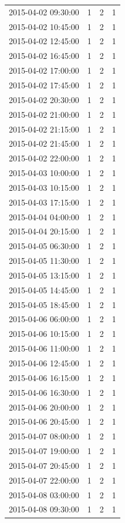 \begin{tabular}{lrrr}
2015-04-02 09:30:00 & 1 & 2 & 1 \\
2015-04-02 10:45:00 & 1 & 2 & 1 \\
2015-04-02 12:45:00 & 1 & 2 & 1 \\
2015-04-02 16:45:00 & 1 & 2 & 1 \\
2015-04-02 17:00:00 & 1 & 2 & 1 \\
2015-04-02 17:45:00 & 1 & 2 & 1 \\
2015-04-02 20:30:00 & 1 & 2 & 1 \\
2015-04-02 21:00:00 & 1 & 2 & 1 \\
2015-04-02 21:15:00 & 1 & 2 & 1 \\
2015-04-02 21:45:00 & 1 & 2 & 1 \\
2015-04-02 22:00:00 & 1 & 2 & 1 \\
2015-04-03 10:00:00 & 1 & 2 & 1 \\
2015-04-03 10:15:00 & 1 & 2 & 1 \\
2015-04-03 17:15:00 & 1 & 2 & 1 \\
2015-04-04 04:00:00 & 1 & 2 & 1 \\
2015-04-04 20:15:00 & 1 & 2 & 1 \\
2015-04-05 06:30:00 & 1 & 2 & 1 \\
2015-04-05 11:30:00 & 1 & 2 & 1 \\
2015-04-05 13:15:00 & 1 & 2 & 1 \\
2015-04-05 14:45:00 & 1 & 2 & 1 \\
2015-04-05 18:45:00 & 1 & 2 & 1 \\
2015-04-06 06:00:00 & 1 & 2 & 1 \\
2015-04-06 10:15:00 & 1 & 2 & 1 \\
2015-04-06 11:00:00 & 1 & 2 & 1 \\
2015-04-06 12:45:00 & 1 & 2 & 1 \\
2015-04-06 16:15:00 & 1 & 2 & 1 \\
2015-04-06 16:30:00 & 1 & 2 & 1 \\
2015-04-06 20:00:00 & 1 & 2 & 1 \\
2015-04-06 20:45:00 & 1 & 2 & 1 \\
2015-04-07 08:00:00 & 1 & 2 & 1 \\
2015-04-07 19:00:00 & 1 & 2 & 1 \\
2015-04-07 20:45:00 & 1 & 2 & 1 \\
2015-04-07 22:00:00 & 1 & 2 & 1 \\
2015-04-08 03:00:00 & 1 & 2 & 1 \\
2015-04-08 09:30:00 & 1 & 2 & 1 \\

\end{tabular}

